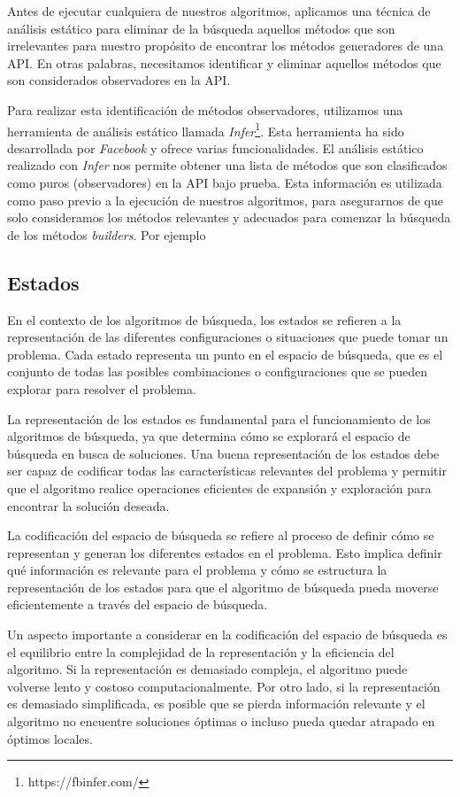 Antes de ejecutar cualquiera de nuestros algoritmos, aplicamos una técnica de análisis estático
para eliminar de la búsqueda aquellos métodos que son irrelevantes para nuestro propósito de encontrar los métodos generadores de una API. En otras palabras, necesitamos identificar y eliminar aquellos métodos que son considerados observadores en la API.

Para realizar esta identificación de métodos observadores, utilizamos una
herramienta de análisis estático llamada
\emph{Infer}\footnote{https://fbinfer.com/}. Esta herramienta ha sido
desarrollada por \emph{Facebook} y ofrece varias funcionalidades. El análisis estático realizado con \emph{Infer} nos permite obtener una lista de métodos que son clasificados como puros (observadores) \cite{Huang:2012} en la API bajo prueba. Esta
información es utilizada como paso previo a la ejecución de nuestros algoritmos, para asegurarnos de que solo consideramos los métodos relevantes y adecuados para comenzar la búsqueda de los métodos \emph{builders}. 
Por ejemplo
\subsection{Estados}
\label{sec:estados}
En el contexto de los algoritmos de búsqueda, los estados se refieren a la representación de las diferentes configuraciones o situaciones que puede tomar un problema. Cada estado representa un punto en el espacio de búsqueda, que es el conjunto de todas las posibles combinaciones o configuraciones que se pueden explorar para resolver el problema.

La representación de los estados es fundamental para el funcionamiento de los algoritmos de búsqueda, ya que determina cómo se explorará el espacio de búsqueda en busca de soluciones. Una buena representación de los estados debe ser capaz de codificar todas las características relevantes del problema y permitir que el algoritmo realice operaciones eficientes de expansión y exploración para encontrar la solución deseada.

La codificación del espacio de búsqueda se refiere al proceso de definir cómo se representan y generan los diferentes estados en el problema. Esto implica definir qué información es relevante para el problema y cómo se estructura la representación de los estados para que el algoritmo de búsqueda pueda moverse eficientemente a través del espacio de búsqueda.

Un aspecto importante a considerar en la codificación del espacio de búsqueda es el equilibrio entre la complejidad de la representación y la eficiencia del algoritmo. Si la representación es demasiado compleja, el algoritmo puede volverse lento y costoso computacionalmente. Por otro lado, si la representación es demasiado simplificada, es posible que se pierda información relevante y el algoritmo no encuentre soluciones óptimas o incluso pueda quedar atrapado en óptimos locales.

